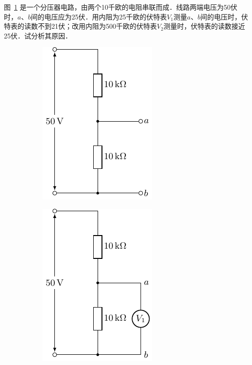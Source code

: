 \begin{example}
图~\ref{fig_B_7-20a} 是一个分压器电路，由两个10千欧的电阻串联而成．线路两端电压为50伏时，$a$、$b$间的电压应为25伏．用内阻为25千欧的伏特表$V_1$测量$a$、$b$间的电压时，伏特表的读数不到21伏；改用内阻为500千欧的伏特表$V_2$测量时，伏特表的读数接近25伏．试分析其原因．
\end{example}
\begin{figure}[htbp]
    \centering
    \begin{subfigure}{0.3\linewidth}
        \centering
        \includegraphics{fig/B/7-20a.pdf}
        \caption{}\label{fig_B_7-20a}
    \end{subfigure}
    \hfil
    \begin{subfigure}{0.3\linewidth}
        \centering
        \includegraphics{fig/B/7-20b.pdf}
        \caption{}\label{fig_B_7-20b}
    \end{subfigure}
    \hfil
    \begin{subfigure}{0.3\linewidth}
        \centering

\end{subfigure}
\end{figure}

